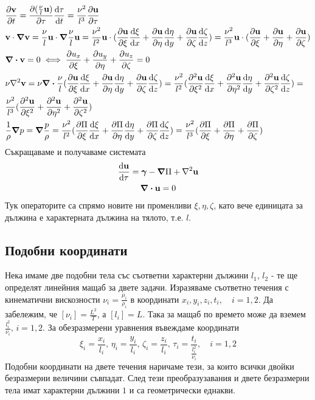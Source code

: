 \begin{align}
	&\pdv{\mathbf{v}}{t} = \pdv{(\frac{\nu}{l}\mathbf{u})}{\tau}\dv{\tau}{t} = \frac{\nu^2}{l^3} \pdv{\mathbf{u}}{\tau} \\
	&\mathbf{v} \cdot \grad \mathbf{v} = 
		\frac{\nu}{l} \mathbf{u} \cdot \grad \frac{\nu}{l} \mathbf{u} = 
		\frac{\nu^2}{l^2} \mathbf{u} \cdot (\pdv{\mathbf{u}}{\xi}\dv{\xi}{x} + \pdv{\mathbf{u}}{\eta}\dv{\eta}{y} + \pdv{\mathbf{u}}{\zeta}\dv{\zeta}{z}) =
		\frac{\nu^2}{l^3} \mathbf{u} \cdot (\pdv{\mathbf{u}}{\xi} + \pdv{\mathbf{u}}{\eta} + \pdv{\mathbf{u}}{\zeta}) \\
	& \div \mathbf{v} = 0 \iff \pdv{u_x}{\xi} + \pdv{u_y}{\eta} + \pdv{u_z}{\zeta} = 0 \\
	& \nu \laplacian \mathbf{v} = 
		\nu \div \frac{\nu}{l} (\pdv{\mathbf{u}}{\xi}\dv{\xi}{x} + \pdv{\mathbf{u}}{\eta}\dv{\eta}{y} + \pdv{\mathbf{u}}{\zeta}\dv{\zeta}{z}) = 
		\frac{\nu^2}{l^2} (\pdv[2]{\mathbf{u}}{\xi}\dv{\xi}{x} + \pdv[2]{\mathbf{u}}{\eta}\dv{\eta}{y} + \pdv[2]{\mathbf{u}}{\zeta}\dv{\zeta}{z}) = \\\nonumber
		&\frac{\nu^2}{l^3} (\pdv[2]{\mathbf{u}}{\xi} + \pdv[2]{\mathbf{u}}{\eta} + \pdv[2]{\mathbf{u}}{\zeta}) \\
	&\frac{1}{\rho}\grad p = 
		\grad \frac{p}{\rho} =
	 	\frac{\nu^2}{l^2} (\pdv{\Pi}{\xi}\dv{\xi}{x} + \pdv{\Pi}{\eta}\dv{\eta}{y} + \pdv{\Pi}{\zeta}\dv{\zeta}{z}) =
		\frac{\nu^2}{l^3} (\pdv{\Pi}{\xi} + \pdv{\Pi}{\eta} + \pdv{\Pi}{\zeta})
\end{align}
Съкращаваме и получаваме системата
\begin{gather}
	\dv{\mathbf{u}}{\tau} = \bm{\gamma} - \grad \Pi + \laplacian \mathbf{u} \\\nonumber
	\div \mathbf{u} = 0
\end{gather}
Тук операторите са спрямо новите ни променливи $\xi, \eta, \zeta$, като вече единицата за дължина е характерната дължина на тялото, т.е. $l$.

\subsection{Подобни координати}
Нека имаме две подобни тела със съответни характерни дължини $l_1$, $l_2$ - те ще определят линейния мащаб за двете задачи. 
Изразяваме съответно течения с кинематични вискозности $\nu_i = \frac{\mu_i}{\rho_i}$ в координати $x_i,y_i,z_i,t_i, \quad i=1,2$.
Да забележим, че $[\nu_i]=\frac{L^2}{T}$, а $[l_i]=L$.
Така за мащаб по времето може да вземем $\frac{l_i^2}{\nu_i},\, i=1,2$. 
За обезразмерени уравнения въвеждаме координати
\begin{equation}
	\xi_i = \frac{x_i}{l_i},\, \eta_i = \frac{y_i}{l_i},\, \zeta_i = \frac{z_i}{l_i},\, \tau_i = \frac{t_i}{\frac{l_i^2}{\nu_i}}, \quad i=1,2
\end{equation}
Подобни координати на двете течения наричаме тези, за които всички двойки безразмерни величини съвпадат.
След тези преобразузавания и двете безразмерни тела имат характерни дължини $1$ и са геометрически еднакви. 
